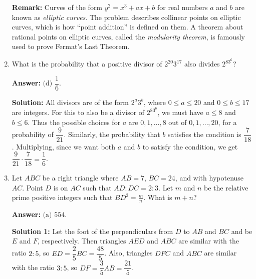 \documentclass[11pt,paper=letter]{scrartcl}
\begin{document}
\begin{enumerate}[left=0pt]
\textbf{Remark:} Curves of the form $y^2 = x^3 + ax + b$ for real numbers $a$ and $b$ are known as \emph{elliptic curves}. The problem describes collinear points on elliptic curves, which is how ``point addition'' is defined on them. A theorem about rational points on elliptic curves, called the \emph{modularity theorem}, is famously used to prove Fermat's Last Theorem.

\item What is the probability that a positive divisor of $2^{20}3^{17}$ also divides $2^83^6$?


\textbf{Answer:} $\boxed{\text{(d) }\dfrac16}$.

\textbf{Solution:} All divisors are of the form $2^a3^b$, where $0 \leq a \leq 20$ and $0 \leq b \leq 17$ are integers. For this to also be a divisor of $2^83^6$, we must have $a \leq 8$ and $b \leq 6$. Thus the possible choices for $a$ are $0, 1, \ldots, 8$ out of $0, 1, \ldots, 20$, for a probability of $\dfrac{9}{21}$. Similarly, the probability that $b$ satisfies the condition is $\dfrac{7}{18}$. Multiplying, since we want both $a$ and $b$ to satisfy the condition, we get $\dfrac{9}{21} \cdot \dfrac{7}{18} = \dfrac16$.

\item Let $ABC$ be a right triangle where $AB = 7$, $BC = 24$, and with hypotenuse $AC$. Point $D$ is on $AC$ such that $AD : DC = 2 : 3$. Let $m$ and $n$ be the relative prime positive integers such that $BD^2 = \frac mn$. What is $m + n$?


\textbf{Answer:} $\boxed{\text{(a) }554}$.

\textbf{Solution 1:} Let the foot of the perpendiculars from $D$ to $AB$ and $BC$ and be $E$ and $F$, respectively. Then triangles $AED$ and $ABC$ are similar with the ratio $2 : 5$, so $ED = \dfrac25 BC = \dfrac{48}5$. Also, triangles $DFC$ and $ABC$ are similar with the ratio $3 : 5$, so $DF = \dfrac35 AB = \dfrac{21}5$. 
\begin{center}
\end{center}


\end{enumerate}
\end{document}
